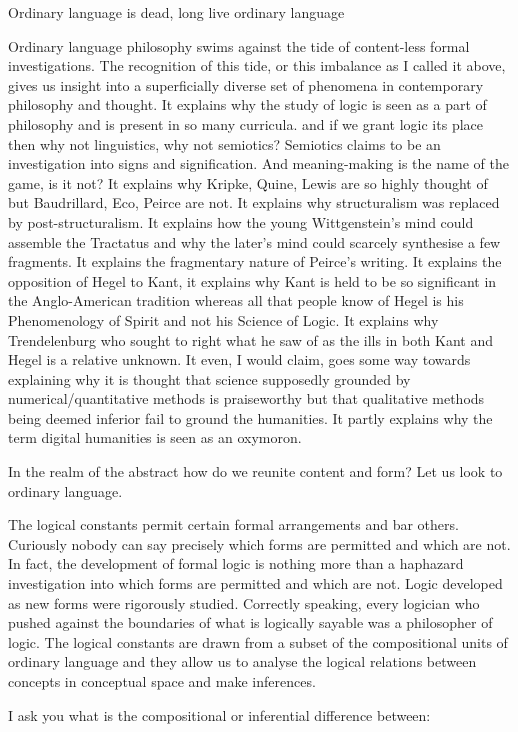 \documentclass[dah,phd,a4paper]{xe_uccthesis}
\begin{document}
Ordinary language is dead, long live ordinary language

Ordinary language philosophy swims against the tide of content-less formal investigations. The recognition of this tide, or this imbalance as I called it above, gives us insight into a superficially diverse set of phenomena in contemporary philosophy and thought. It explains why the study of logic is seen as a part of philosophy and is present in so many curricula. and if we grant logic its  place then why not linguistics, why not semiotics? Semiotics claims to be an investigation into signs and signification. And meaning-making is the name of the game, is it not? It explains why Kripke, Quine, Lewis are so highly thought of but Baudrillard, Eco, Peirce are not. It explains why structuralism was replaced by post-structuralism. It explains how the young Wittgenstein's mind could assemble the Tractatus and why the later's mind could scarcely synthesise a few fragments. It explains the fragmentary nature of Peirce's writing. It explains the opposition of Hegel to Kant, it explains why Kant is held to be so significant in the Anglo-American tradition whereas all that people know of Hegel is his Phenomenology of Spirit and not his Science of Logic. It explains why Trendelenburg who sought to right what he saw of as the ills in both Kant and Hegel is a relative unknown. It even, I would claim, goes some way towards explaining why it is thought that science supposedly grounded by numerical/quantitative methods is praiseworthy but that qualitative methods being deemed inferior fail to ground the humanities. It partly explains why the term digital humanities is seen as an oxymoron.

In the realm of the abstract how do we reunite content and form? Let us look to ordinary language.

The logical constants permit certain formal arrangements and bar others. Curiously nobody can say precisely which forms are permitted and which are not. In fact, the development of formal logic is nothing more than a haphazard investigation into which forms are permitted and which are not. Logic developed as new forms were rigorously studied. Correctly speaking, every logician who pushed against the boundaries of what is logically sayable was a philosopher of logic. The logical constants are drawn from a subset of the compositional units of ordinary language and they allow us to analyse the logical relations between concepts in conceptual space and make inferences.

I ask you what is the compositional or inferential difference between:
\end{document}
